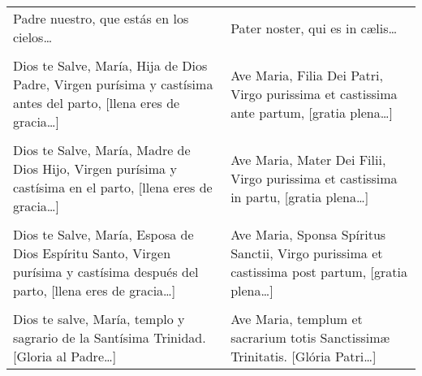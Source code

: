 \documentclass[./main.tex]{subfiles}
\begin{document}
\label{final-prayer}

\begin{longtable} { p{} p{} }
    Padre nuestro, que estás en los cielos{\ldots}
        &
    Pater noster, qui es in cælis{\ldots}\\\\

    Dios te Salve, María, Hija de Dios Padre, Virgen purísima y castísima antes del parto, [llena eres de gracia{\ldots}]
        &
    Ave Maria, Filia Dei Patri, Virgo purissima et castissima ante partum, [gratia plena{\ldots}]\\\\

    Dios te Salve, María, Madre de Dios Hijo, Virgen purísima y castísima en el parto, [llena eres de gracia{\ldots}]
        &
    Ave Maria, Mater Dei Filii, Virgo purissima et castissima in partu, [gratia plena{\ldots}]\\\\

    Dios te Salve, María, Esposa de Dios Espíritu Santo, Virgen purísima y castísima después del parto, [llena eres de gracia{\ldots}]
        &
    Ave Maria, Sponsa Spíritus Sanctii, Virgo purissima et castissima post partum, [gratia plena{\ldots}]\\\\      
    
    Dios te salve, María, templo y sagrario de la Santísima Trinidad. [Gloria al Padre{\ldots}]
        &
    Ave Maria, templum et sacrarium totis Sanctissimæ Trinitatis. [Glória Patri{\ldots}]
\end{longtable}
\end{document}
